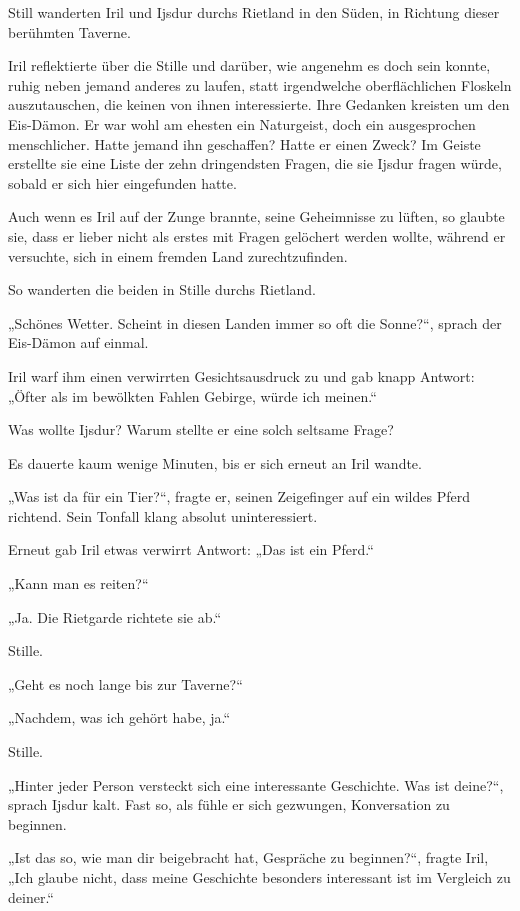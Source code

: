 \trennzeichen



Still wanderten Iril und Ijsdur durchs Rietland in den Süden, in Richtung dieser berühmten Taverne.

Iril reflektierte über die Stille und darüber, wie angenehm es doch sein konnte, ruhig neben jemand anderes zu laufen, statt irgendwelche oberflächlichen Floskeln auszutauschen, die keinen von ihnen interessierte. Ihre Gedanken kreisten um den Eis-Dämon. Er war wohl am ehesten ein Naturgeist, doch ein ausgesprochen menschlicher. Hatte jemand ihn geschaffen? Hatte er einen Zweck? Im Geiste erstellte sie eine Liste der zehn dringendsten Fragen, die sie Ijsdur fragen würde, sobald er sich hier eingefunden hatte.

Auch wenn es Iril auf der Zunge brannte, seine Geheimnisse zu lüften, so glaubte sie, dass er lieber nicht als erstes mit Fragen gelöchert werden wollte, während er versuchte, sich in einem fremden Land zurechtzufinden.

So wanderten die beiden in Stille durchs Rietland.

„Schönes Wetter. Scheint in diesen Landen immer so oft die Sonne?“, sprach der Eis-Dämon auf einmal.

Iril warf ihm einen verwirrten Gesichtsausdruck zu und gab knapp Antwort: „Öfter als im bewölkten Fahlen Gebirge, würde ich meinen.“

Was wollte Ijsdur? Warum stellte er eine solch seltsame Frage?

Es dauerte kaum wenige Minuten, bis er sich erneut an Iril wandte.

„Was ist da für ein Tier?“, fragte er, seinen Zeigefinger auf ein wildes Pferd richtend. Sein Tonfall klang absolut uninteressiert.

Erneut gab Iril etwas verwirrt Antwort: „Das ist ein Pferd.“

„Kann man es reiten?“

„Ja. Die Rietgarde richtete sie ab.“

Stille.

„Geht es noch lange bis zur Taverne?“

„Nachdem, was ich gehört habe, ja.“

Stille.

„Hinter jeder Person versteckt sich eine interessante Geschichte. Was ist deine?“, sprach Ijsdur kalt. Fast so, als fühle er sich gezwungen, Konversation zu beginnen.

„Ist das so, wie man dir beigebracht hat, Gespräche zu beginnen?“, fragte Iril, „Ich glaube nicht, dass meine Geschichte besonders interessant ist im Vergleich zu deiner.“


